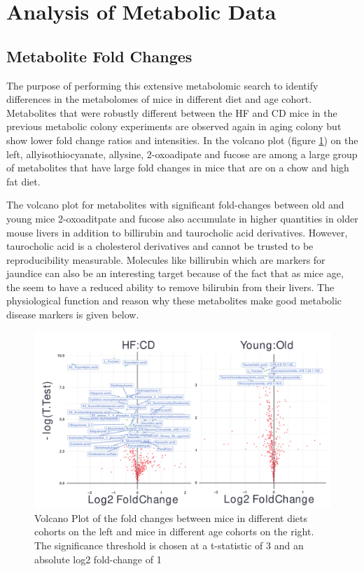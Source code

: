 \documentclass[a4paper,11pt,twoside]{book}
\begin{document}
	
	\section{Analysis of Metabolic Data}
	
	\subsection{Metabolite Fold Changes}
	
	The purpose of performing this extensive metabolomic search to identify differences in the metabolomes of mice in different diet and age cohort. Metabolites that were robustly different between the HF and CD mice in the previous metabolic colony experiments are observed again in aging colony but show lower fold change ratios and intensities. In the volcano plot (figure \ref{volcano: Meatbolite Fold Changes}) on the left, allyisothiocyanate, allysine, 2-oxoadipate and fucose are among a large group of metabolites that have large fold changes in mice that are on a chow and high fat diet. 
	
	The volcano plot for metabolites with significant fold-changes between old and young mice   2-oxoaditpate and fucose also accumulate in higher quantities in older mouse livers in addition to billirubin and taurocholic acid derivatives. However, taurocholic acid is a cholesterol derivatives and cannot be trusted to be reproducibility measurable. Molecules like billirubin which are markers for jaundice can also be an interesting target because of the fact that as mice age, the seem to have a reduced ability to remove bilirubin from their livers. The physiological function and reason why these metabolites make good metabolic disease markers is given below.
		
	
	\begin{figure}[t!]
		\centering
		\includegraphics[width=\linewidth]{3.Metabolomics/Volcano}
		\caption{Volcano Plot of the fold changes between mice in different diets cohorts on the left and mice in different age cohorts on the right. The significance threshold is chosen at a t-statistic of 3 and an absolute log2 fold-change of 1}
		\label{volcano: Meatbolite Fold Changes}
	\end{figure}
	
\end{document}
